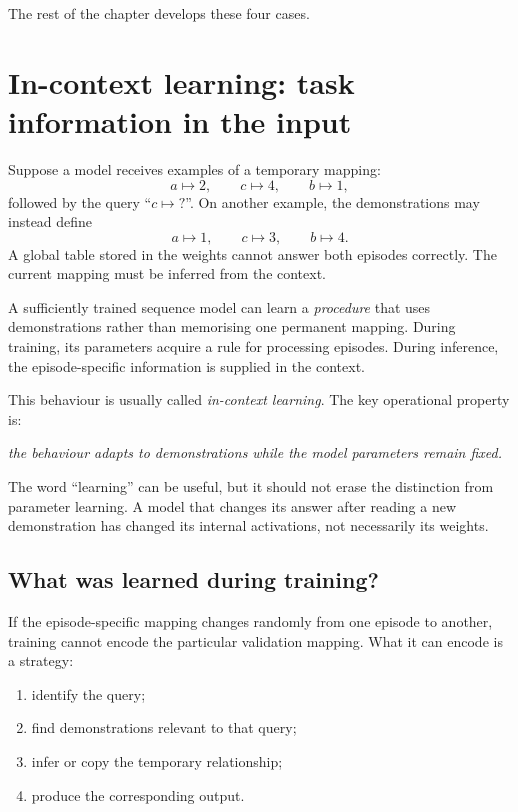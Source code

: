 The rest of the chapter develops these four cases.

\section{In-context learning: task information in the input}

Suppose a model receives examples of a temporary mapping:
\[
  a\mapsto 2,\qquad c\mapsto 4,\qquad b\mapsto 1,
\]
followed by the query ``\(c\mapsto ?\)''. On another example, the demonstrations may instead define
\[
  a\mapsto 1,\qquad c\mapsto 3,\qquad b\mapsto 4.
\]
A global table stored in the weights cannot answer both episodes correctly. The current mapping must be inferred from the context.

A sufficiently trained sequence model can learn a \emph{procedure} that uses demonstrations rather than memorising one permanent mapping. During training, its parameters acquire a rule for processing episodes. During inference, the episode-specific information is supplied in the context.

This behaviour is usually called \emph{in-context learning}. The key operational property is:
\begin{center}
  \emph{the behaviour adapts to demonstrations while the model parameters remain fixed.}
\end{center}

The word ``learning'' can be useful, but it should not erase the distinction from parameter learning. A model that changes its answer after reading a new demonstration has changed its internal activations, not necessarily its weights.

\subsection{What was learned during training?}

If the episode-specific mapping changes randomly from one episode to another, training cannot encode the particular validation mapping. What it can encode is a strategy:
\begin{enumerate}[leftmargin=*]
  \item identify the query;
  \item find demonstrations relevant to that query;
  \item infer or copy the temporary relationship;
  \item produce the corresponding output.
\end{enumerate}

